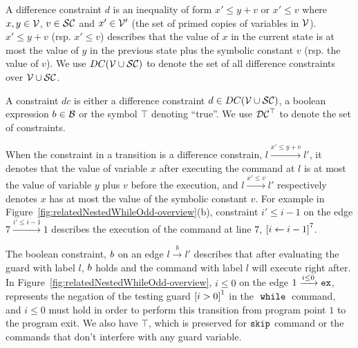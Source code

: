 \begin{defn}
A difference constraint $d$ is an inequality of
form $x' \leq y + v$ or $x' \leq v$ where $x, y \in \mathcal{V} $, $v \in \mathcal{SC}$ and $x' \in \mathcal{V}'$ (the set of primed copies of variables in $\mathcal{V}$).
$x' \leq y + v$ (rsp. $x' \leq v$) describes that the value of $x$ in the current state is
at most the value of $y$ in the previous state plus the symbolic constant $v$ (rsp. the value of $v$).
We use $DC(\mathcal{V} \cup \mathcal{SC})$ to denote the set of all difference constraints over $\mathcal{V} \cup \mathcal{SC}$.
\end{defn}


\begin{defn}[Constraints]
A constraint $dc$
is either a
difference constraint $d \in DC(\mathcal{V} \cup \mathcal{SC})$, a boolean expression $b \in \mathcal{B}$
or the symbol $\top$ denoting ``true''. We use $\mathcal{DC}^{\top}$ to denote the set of constraints. 
\end{defn}

When the constraint in a transition is a difference constrain, $l \xrightarrow{x' \leq y + v} l'$,
it denotes that
the value of variable $x$
after executing the command at $l$ is at most
the value of variable $y$ plus $v$ before the execution,
and $l \xrightarrow{x' \leq v} l'$ respectively denotes
$x$ has at most
the value of the symbolic constant $v$.
For example in Figure~\ref{fig:relatedNestedWhileOdd-overview}(b), constraint $i' \leq i - 1$ on the edge $7 \xrightarrow{i' \leq i - 1} 1$
describes the execution of
 the command at line $7$, 
$\clabel{\assign{i}{i - 1}}^{7}$. 


The boolean constraint, $b$ on an edge $l \xrightarrow{b} l'$ describes
that after evaluating the guard with label $l$,
$b$ holds and the command with label $l$ will execute right after.
In Figure~\ref{fig:relatedNestedWhileOdd-overview}, $i \leq 0 $ on the edge $1 \xrightarrow{i \leq 0} \mathtt{ex}$, 
represents the negation of the testing guard $\clabel{i > 0}^1$
in the $\;\mathtt{while}\;$ command, and $i \leq 0$ must hold in order to perform this transition from program point $1$ to
the program exit. 
We also have $\top$, which is preserved for $\mathtt{skip}$ command or the commands that don't interfere with any guard variable.



